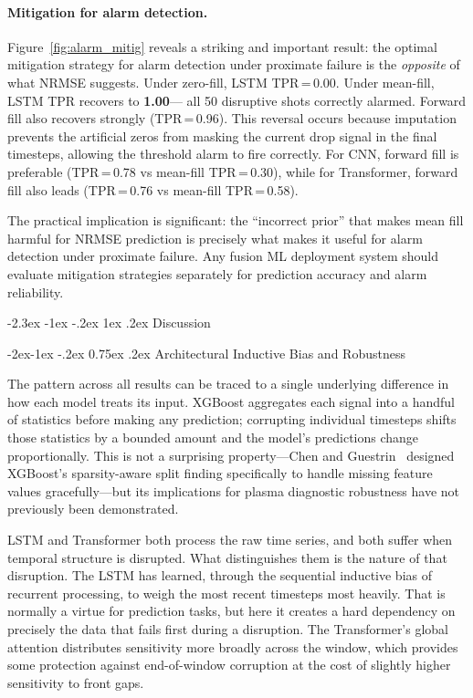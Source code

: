 \documentclass[10pt,twocolumn]{article}
\makeatletter
\renewcommand\section{\@startsection{section}{1}{\z@}%
  {-2.3ex \@plus -1ex \@minus -.2ex}%
  {1ex \@plus .2ex}%
  {\normalfont\Large\bfseries}}
\renewcommand\subsection{\@startsection{subsection}{2}{\z@}%
  {-2ex\@plus -1ex \@minus -.2ex}%
  {0.75ex \@plus .2ex}%
  {\normalfont\large\bfseries}}
\makeatother
\begin{document}
\paragraph{Mitigation for alarm detection.}
Figure~\ref{fig:alarm_mitig} reveals a striking and important result:
the optimal mitigation strategy for alarm detection under proximate
failure is the \textit{opposite} of what NRMSE suggests. Under zero-fill,
LSTM TPR\,=\,0.00. Under mean-fill, LSTM TPR recovers to \textbf{1.00}—
all 50 disruptive shots correctly alarmed. Forward fill also recovers
strongly (TPR\,=\,0.96). This reversal occurs because imputation
prevents the artificial zeros from masking the current drop signal in
the final timesteps, allowing the threshold alarm to fire correctly.
For CNN, forward fill is preferable (TPR\,=\,0.78 vs mean-fill
TPR\,=\,0.30), while for Transformer, forward fill also leads
(TPR\,=\,0.76 vs mean-fill TPR\,=\,0.58).

The practical implication is significant: the ``incorrect prior''
that makes mean fill harmful for NRMSE prediction is precisely what
makes it useful for alarm detection under proximate failure. Any
fusion ML deployment system should evaluate mitigation strategies
separately for prediction accuracy and alarm reliability.

\section{Discussion}

\subsection{Architectural Inductive Bias and Robustness}

The pattern across all results can be traced to a single underlying
difference in how each model treats its input. XGBoost aggregates each
signal into a handful of statistics before making any prediction;
corrupting individual timesteps shifts those statistics by a bounded
amount and the model's predictions change proportionally. This is not
a surprising property—Chen and Guestrin~\cite{chen2016xgboost}
designed XGBoost's sparsity-aware split finding specifically to handle
missing feature values gracefully—but its implications for plasma
diagnostic robustness have not previously been demonstrated.

LSTM and Transformer both process the raw time series, and both suffer
when temporal structure is disrupted. What distinguishes them is the
nature of that disruption. The LSTM has learned, through the sequential
inductive bias of recurrent processing, to weigh the most recent
timesteps most heavily. That is normally a virtue for prediction tasks,
but here it creates a hard dependency on precisely the data that fails
first during a disruption. The Transformer's global attention distributes
sensitivity more broadly across the window, which provides some
protection against end-of-window corruption at the cost of slightly
higher sensitivity to front gaps.
\end{document}
